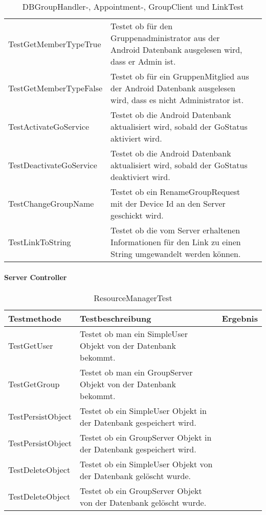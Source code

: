 \begin{table}[H]
{\begin{tabular}{|p{}|p{}|>{\centering}p{}|}
				\hspace{0pt}TestGetMemberTypeTrue & Testet ob für den Gruppenadministrator aus der Android Datenbank ausgelesen wird, dass er Admin ist. & \checkmark\tabularnewline
				\hspace{0pt}TestGetMemberTypeFalse & Testet ob für ein GruppenMitglied aus der Android Datenbank ausgelesen wird, dass es nicht Administrator ist. & \checkmark\tabularnewline
				\hspace{0pt}TestActivateGoService & Testet ob die Android Datenbank aktualisiert wird, sobald der GoStatus aktiviert wird. & \checkmark\tabularnewline
				\hspace{0pt}TestDeactivateGoService & Testet ob die Android Datenbank aktualisiert wird, sobald der GoStatus deaktiviert wird. & \checkmark\tabularnewline
				\hspace{0pt}TestChangeGroupName & Testet ob ein RenameGroupRequest mit der Device Id an den Server geschickt wird. & \checkmark\tabularnewline
				\hspace{0pt}TestLinkToString & Testet ob die vom Server erhaltenen Informationen für den Link zu einen String umgewandelt werden können. & \checkmark\tabularnewline
				\hline
			\end{tabular}}
			\caption{DBGroupHandler-, Appointment-, GroupClient und LinkTest}
		\end{table}
		
		
		
		\paragraph{Server Controller}
		\begin{table}[H]
			{
				\begin{tabular}{|p{}|p{}|>{\centering}p{}|}
					\hline
					Testmethode & Testbeschreibung & Ergebnis\tabularnewline
					\hline
					\hspace{0pt}TestGetUser & Testet ob man ein SimpleUser Objekt von der Datenbank bekommt. &	\checkmark\tabularnewline
					\hspace{0pt}TestGetGroup & Testet ob man ein GroupServer Objekt von der Datenbank bekommt. &	\checkmark\tabularnewline
					\hspace{0pt}TestPersistObject & Testet ob ein SimpleUser Objekt in der Datenbank gespeichert wird. &	\checkmark\tabularnewline
					\hspace{0pt}TestPersistObject & Testet ob ein GroupServer Objekt in der Datenbank gespeichert wird. &	\checkmark\tabularnewline
					\hspace{0pt}TestDeleteObject & Testet ob ein SimpleUser Objekt von der Datenbank gelöscht wurde. &	\checkmark\tabularnewline
					\hspace{0pt}TestDeleteObject & Testet ob ein GroupServer Objekt von der Datenbank gelöscht wurde. &	\checkmark\tabularnewline
					\hline
				\end{tabular}}
				\caption{ResourceManagerTest}
			\end{table}
		
